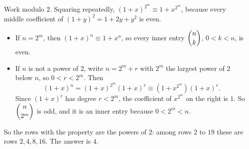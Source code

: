 Work modulo $2$. Squaring repeatedly, $(1+x)^{2^m}\equiv1+x^{2^m}$, because every middle coefficient of $(1+y)^2=1+2y+y^2$ is even.
\begin{itemize}
\item If $n=2^m$, then $(1+x)^n\equiv1+x^n$, so every inner entry $\dbinom{n}{k}$, $0<k<n$, is even.
\item If $n$ is not a power of $2$, write $n=2^m+r$ with $2^m$ the largest power of $2$ below $n$, so $0<r<2^m$. Then
\[
(1+x)^n=(1+x)^{2^m}(1+x)^r\equiv(1+x^{2^m})(1+x)^r .
\]
Since $(1+x)^r$ has degree $r<2^m$, the coefficient of $x^{2^m}$ on the right is $1$. So $\dbinom{n}{2^m}$ is odd, and it is an inner entry because $0<2^m<n$.
\end{itemize}
So the rows with the property are the powers of $2$: among rows $2$ to $19$ these are rows $2,4,8,16$. The answer is $\boxed{4}$.
